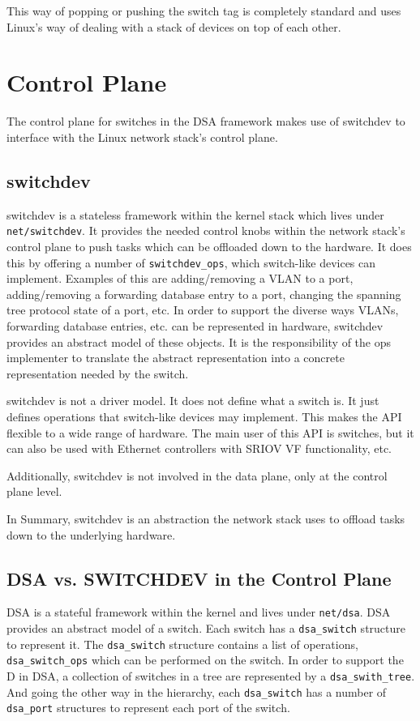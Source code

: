 \documentclass[letterpaper]{article}
\begin{document}
This way of popping or pushing the switch tag is completely standard
and uses Linux's way of dealing with a stack of devices on top of each
other.

\section{Control Plane}

The control plane for switches in the DSA framework makes use of
switchdev to interface with the Linux network stack's control plane.

\subsection{switchdev}

switchdev is a stateless framework within the kernel stack which lives
under \verb|net/switchdev|. It provides the needed control knobs
within the network stack's control plane to push tasks which can be
offloaded down to the hardware. It does this by offering a number of
\verb|switchdev_ops|, which switch-like devices can
implement. Examples of this are adding/removing a VLAN to a port,
adding/removing a forwarding database entry to a port, changing the spanning
tree protocol state of a port, etc. In order to support the diverse
ways VLANs, forwarding database entries, etc. can be represented in
hardware, switchdev provides an abstract model of these objects. It is
the responsibility of the ops implementer to translate the abstract
representation into a concrete representation needed by the switch.

switchdev is not a driver model. It does not define what a switch
is. It just defines operations that switch-like devices may
implement. This makes the API flexible to a wide range of
hardware. The main user of this API is switches, but it can also be
used with Ethernet controllers with SRIOV VF functionality, etc.

Additionally, switchdev is not involved in the data plane, only at the
control plane level.

In Summary, switchdev is an abstraction the network stack uses to
offload tasks down to the underlying hardware.

\subsection{DSA vs. SWITCHDEV in the Control Plane}

DSA is a stateful framework within the kernel and lives under
\verb|net/dsa|. DSA provides an abstract model of a switch. Each
switch has a \verb|dsa_switch| structure to represent it. The
\verb|dsa_switch| structure contains a list of operations,
\verb|dsa_switch_ops| which can be performed on the switch. In order
to support the D in DSA, a collection of switches in a tree are
represented by a \verb|dsa_swith_tree|. And going the other way in the
hierarchy, each \verb|dsa_switch| has a number of \verb|dsa_port|
structures to represent each port of the switch.
\end{document}
